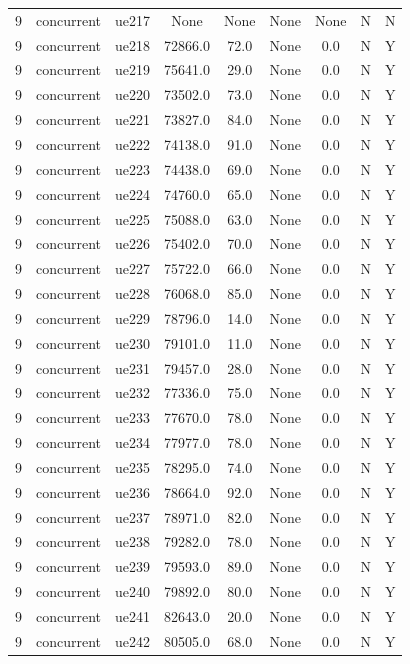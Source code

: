 \begin{table}[ht]
\begin{tabular}{|c|c|c|c|c|c|c|c|c|}
9 & concurrent & ue217 & None & None & None & None & N & N \\
9 & concurrent & ue218 & 72866.0 & 72.0 & None & 0.0 & N & Y \\
9 & concurrent & ue219 & 75641.0 & 29.0 & None & 0.0 & N & Y \\
9 & concurrent & ue220 & 73502.0 & 73.0 & None & 0.0 & N & Y \\
9 & concurrent & ue221 & 73827.0 & 84.0 & None & 0.0 & N & Y \\
9 & concurrent & ue222 & 74138.0 & 91.0 & None & 0.0 & N & Y \\
9 & concurrent & ue223 & 74438.0 & 69.0 & None & 0.0 & N & Y \\
9 & concurrent & ue224 & 74760.0 & 65.0 & None & 0.0 & N & Y \\
9 & concurrent & ue225 & 75088.0 & 63.0 & None & 0.0 & N & Y \\
9 & concurrent & ue226 & 75402.0 & 70.0 & None & 0.0 & N & Y \\
9 & concurrent & ue227 & 75722.0 & 66.0 & None & 0.0 & N & Y \\
9 & concurrent & ue228 & 76068.0 & 85.0 & None & 0.0 & N & Y \\
9 & concurrent & ue229 & 78796.0 & 14.0 & None & 0.0 & N & Y \\
9 & concurrent & ue230 & 79101.0 & 11.0 & None & 0.0 & N & Y \\
9 & concurrent & ue231 & 79457.0 & 28.0 & None & 0.0 & N & Y \\
9 & concurrent & ue232 & 77336.0 & 75.0 & None & 0.0 & N & Y \\
9 & concurrent & ue233 & 77670.0 & 78.0 & None & 0.0 & N & Y \\
9 & concurrent & ue234 & 77977.0 & 78.0 & None & 0.0 & N & Y \\
9 & concurrent & ue235 & 78295.0 & 74.0 & None & 0.0 & N & Y \\
9 & concurrent & ue236 & 78664.0 & 92.0 & None & 0.0 & N & Y \\
9 & concurrent & ue237 & 78971.0 & 82.0 & None & 0.0 & N & Y \\
9 & concurrent & ue238 & 79282.0 & 78.0 & None & 0.0 & N & Y \\
9 & concurrent & ue239 & 79593.0 & 89.0 & None & 0.0 & N & Y \\
9 & concurrent & ue240 & 79892.0 & 80.0 & None & 0.0 & N & Y \\
9 & concurrent & ue241 & 82643.0 & 20.0 & None & 0.0 & N & Y \\
9 & concurrent & ue242 & 80505.0 & 68.0 & None & 0.0 & N & Y \\

\end{tabular}
\end{table}

